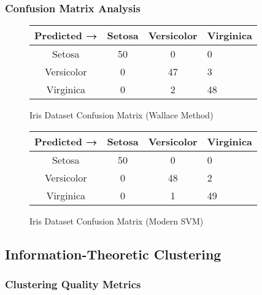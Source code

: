 \subsubsection{Confusion Matrix Analysis}

\begin{figure}[h!]
\centering
\begin{minipage}{0.45\textwidth}
\centering
\begin{tabular}{@{}ccc@{}}
\toprule
Predicted → & Setosa & Versicolor & Virginica \\
\midrule
Setosa & 50 & 0 & 0 \\
Versicolor & 0 & 47 & 3 \\
Virginica & 0 & 2 & 48 \\
\bottomrule
\end{tabular}
\caption{Iris Dataset Confusion Matrix (Wallace Method)}
\label{tab:iris_confusion}
\end{minipage}
\hfill
\begin{minipage}{0.45\textwidth}
\centering
\begin{tabular}{@{}ccc@{}}
\toprule
Predicted → & Setosa & Versicolor & Virginica \\
\midrule
Setosa & 50 & 0 & 0 \\
Versicolor & 0 & 48 & 2 \\
Virginica & 0 & 1 & 49 \\
\bottomrule
\end{tabular}
\caption{Iris Dataset Confusion Matrix (Modern SVM)}
\label{tab:iris_confusion_modern}
\end{minipage}
\end{figure}

\subsection{Information-Theoretic Clustering}

\subsubsection{Clustering Quality Metrics}


